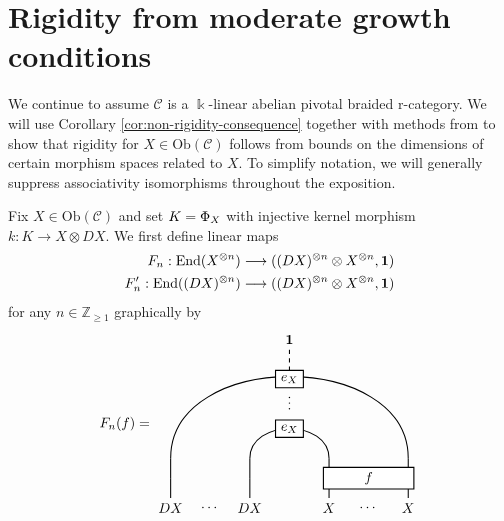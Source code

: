 \documentclass[11pt, reqno]{amsart}
\theoremstyle{definition}\newtheorem{defi}[thm]{Definition}
\theoremstyle{definition}\newtheorem{rem}[thm]{Remark}
\theoremstyle{definition}\newtheorem{exam}[thm]{Example}
\theoremstyle{definition}\newtheorem{assum}[thm]{Assumption}
\newcommand{\cC}{\mathcal{C}}
\newcommand{\ZZ}{\mathbb{Z}}
\newcommand{\vac}{\mathbf{1}}
\let\ker\relax
\let\hom\relax
\DeclareMathOperator{\ker}{Ker}
\DeclareMathOperator{\hom}{Hom}
\begin{document}
\section{Rigidity from moderate growth conditions}\label{sec:rigidity-proof}


We continue to assume $\cC$ is a $\Bbbk$-linear abelian pivotal braided r-category. We will use Corollary \ref{cor:non-rigidity-consequence} together with methods from \cite{EP} to show that rigidity for $X\in\mathrm{Ob}(\cC)$ follows from bounds on the dimensions of certain morphism spaces related to $X$. To simplify notation, we will generally suppress associativity isomorphisms throughout the exposition.

Fix $X\in\mathrm{Ob}(\cC)$ and set $K=\ker\Phi_X$ with injective kernel morphism $k: K\rightarrow X\otimes DX$. We first define linear maps
\begin{align*}
F_n: \mathrm{End}(X^{\otimes n})&\longrightarrow\hom((DX)^{\otimes n}\otimes X^{\otimes n},\vac)\\
F'_n: \mathrm{End}((DX)^{\otimes n})&\longrightarrow\hom((DX)^{\otimes n}\otimes X^{\otimes n},\vac)
\end{align*}
for any $n\in\ZZ_{\geq 1}$ graphically by
\begin{equation*}
F_n(f) =
 \begin{matrix}
    \begin{tikzpicture}[scale = 1, baseline = {(current bounding box.center)}, line width=0.75pt]
        \draw (0,3.25) -- (0,3.75);
        \draw (2,3.25) -- (2,3.75);
        \draw (4,3.25) -- (4,3.75);
        \draw (6,3.25) -- (6,3.75);
        \draw (0,3.75) -- (0,4.25);
        \draw (2,3.75) -- (2,4.25);
        \draw (4,3.75) -- (4,4.25);
        \draw (6,3.75) -- (6,4.25);
        \draw (2,4.25) .. controls (2,5.25) and (4,5.25) .. (4,4.25);
        \draw (0,4.25) .. controls (0,7) and (6,7) .. (6,4.25);
        \draw[dashed] (3,6.25) -- (3,7);
\node at (0,3) {$DX$};
\node at (1,3) {$\cdots$};
\node at (2,3) {$DX$};
\node at (4,3) {$X$};
\node at (5,3) {$\cdots$};
\node at (6,3) {$X$};
\node at (3,5.75) {$\vdots$};
\node at (3,7.25) {$\vac$};
      \node at (5,3.75) [draw,minimum width=65pt,minimum height=10pt,thick, fill=white] {$f$};
      \node at (3,5) [draw,minimum width=20pt,minimum height=10pt,thick, fill=white] {$e_X$};
      \node at (3,6.25) [draw,minimum width=20pt,minimum height=10pt,thick, fill=white] {$e_X$};
        \end{tikzpicture}
   \end{matrix}
   \end{equation*}
\end{document}
